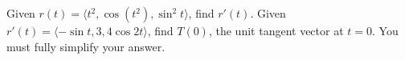 \documentclass[addpoints]{exam}
\begin{document}
\begin{questions}
\question[30]  Given $r(t) = \langle t^2, \cos (t^2) , \sin ^2 t \rangle$, find $r'(t)$.  
\vspace{0.5cm}
\question[30] Given $r'(t) = \langle - \sin t , 3, 4 \cos 2t \rangle$, find $T(0)$, the unit tangent vector at $t = 0$. You must fully simplify your answer. 



\end{questions}
\end{document}
